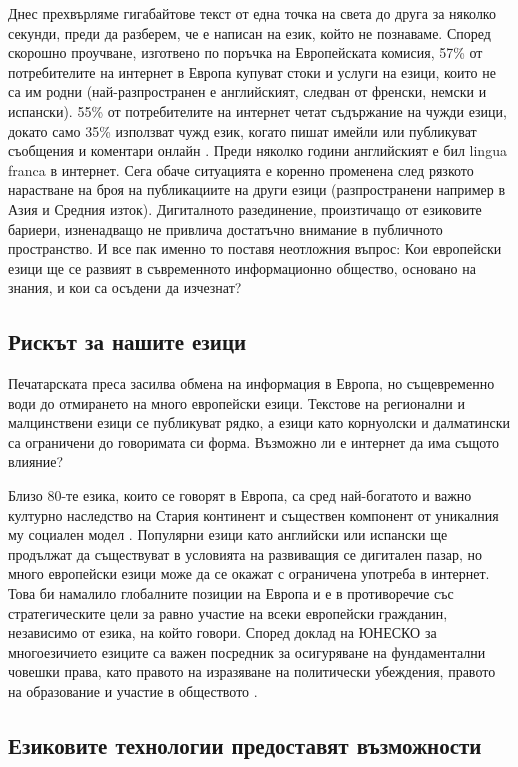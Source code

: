 \documentclass[]{../../metanetpaper}
\begin{document}
\begin{multicols}{2}
Днес прехвърляме гигабайтове текст от една точка на света до друга за няколко секунди, преди да разберем, че е написан на език, който не познаваме. Според скорошно проучване, изготвено по поръчка на Европейската
 комисия, 57\% от потребителите на интернет в Европа
 купуват стоки и услуги на езици, които не са им родни
 (най-разпространен е английският, следван от
 френски, немски и испански). 55\% от потребителите на интернет четат съдържание на чужди езици, докато само 35\% използват чужд език, когато пишат имейли или публикуват съобщения и коментари онлайн \cite{EC1}. Преди няколко
 години английският е бил lingua franca в интернет. Сега обаче ситуацията е коренно променена след  рязкото нарастване  на броя на публикациите на други езици (разпространени например в Азия и Средния изток). Дигиталното разединение, произтичащо от езиковите бариери, 
 изненадващо не привлича достатъчно внимание в публичното
 пространство. И все пак именно то поставя неотложния
 въпрос: Кои европейски езици ще се развият в съвременното информационно общество, основано на знания, и кои са осъдени да изчезнат?

\subsection{Рискът за нашите езици}

Печатарската преса засилва обмена на информация в Европа, но същевременно води до отмирането на много европейски езици. Текстове на регионални и малцинствени езици се публикуват рядко, а  езици като корнуолски и далматински са ограничени до говоримата си форма. Възможно ли е интернет да има същото влияние?

Близо  80-те езика, които се говорят в Европа, са сред
 най-богатото и важно културно наследство на Стария континент и съществен  компонент от уникалния му социален модел  \cite{EC2}. Популярни езици като английски или испански ще продължат да съществуват в условията на развиващия се дигитален пазар, но много европейски езици може да се окажат
с ограничена употреба в интернет. Това би намалило глобалните позиции на Европа и е в противоречие със стратегическите цели за равно участие на всеки европейски
 гражданин, независимо от езика, на който говори. Според доклад на ЮНЕСКО за многоезичието  езиците са важен посредник за осигуряване на
фундаментални  човешки права, като правото
 на изразяване на политически убеждения, правото на образование и участие в обществото \cite{Unesco1}.

\subsection{Езиковите технологии предоставят възможности}


\end{multicols}
\end{document}
